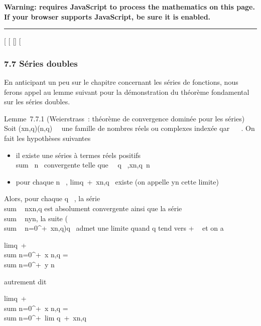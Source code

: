 \textbf{Warning: 
requires JavaScript to process the mathematics on this page.\\ If your
browser supports JavaScript, be sure it is enabled.}

\begin{center}\rule{3in}{0.4pt}\end{center}

{[}
{[}
{[}{]}
{[}

\subsubsection{7.7 Séries doubles}

En anticipant un peu sur le chapitre concernant les séries de fonctions,
nous ferons appel au lemme suivant pour la démonstration du théorème
fondamental sur les séries doubles.

Lemme~7.7.1 (Weierstrass~: théorème de convergence dominée pour les
séries) Soit (xn,q)(n,q)\in{}~\times{}~ une famille de nombres
réels ou complexes indexée qar ~ \times {}~. On fait les hypothèses suivantes

\begin{itemize}
\itemsep1pt\parskip0pt
\item
  il existe une séries à termes réels positifs
  \\sum  \alpha~n~
  convergente telle que \forall~~q \in
  ~,\textbar{}xn,q\textbar{}\leq \alpha~n
\item
  pour chaque n \in {}~,
  limq\rightarrow~+\infty~xn,q~ existe (on
  appelle yn cette limite)
\end{itemize}

Alors, pour chaque q \in {}~, la série
\\sum ~
nxn,q est absolument convergente ainsi que la série
\\sum ~
nyn, la suite \left
(\\sum ~
n=0^+\infty~xn,q\right )q\in{}~
admet une limite quand q tend vers + \infty~ et on a

limq\rightarrow~+\infty~~\\sum
n=0^+\infty~x n,q = \\sum
n=0^+\infty~y n

autrement dit

limq\rightarrow~+\infty~~\\sum
n=0^+\infty~x n,q = \\sum
n=0^+\infty~lim q\rightarrow~+\infty~xn,q

